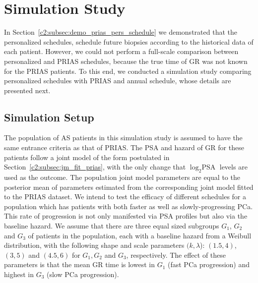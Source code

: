 \section{Simulation Study}
\label{c2:sec:simulation_study}
In Section~\ref{c2:subsec:demo_prias_pers_schedule} we demonstrated that the personalized schedules, schedule future biopsies according to the historical data of each patient. However, we could not perform a full-scale comparison between personalized and PRIAS schedules, because the true time of GR was not known for the PRIAS patients. To this end, we conducted a simulation study comparing personalized schedules with PRIAS and annual schedule, whose details are presented next.

\subsection{Simulation Setup}
\label{c2:subsec:simulation_setup}
The population of AS patients in this simulation study is assumed to have the same entrance criteria as that of PRIAS. The PSA and hazard of GR for these patients follow a joint model of the form postulated in Section~\ref{c2:subsec:jm_fit_prias}, with the only change that $\log_2 \mbox{PSA}$ levels are used as the outcome. The population joint model parameters are equal to the posterior mean of parameters estimated from the corresponding joint model fitted to the PRIAS dataset. We intend to test the efficacy of different schedules for a population which has patients with both faster as well as slowly-progressing PCa. This rate of progression is not only manifested via PSA profiles but also via the baseline hazard. We assume that there are three equal sized subgroups $G_1$, $G_2$ and $G_3$ of patients in the population, each with a baseline hazard from a Weibull distribution, with the following shape and scale parameters $(k, \lambda$): $(1.5, 4)$, $(3, 5)$ and $(4.5, 6)$ for $G_1, G_2$ and $G_3$, respectively. The effect of these parameters is that the mean GR time is lowest in $G_1$ (fast PCa progression) and highest in $G_3$ (slow PCa progression).

